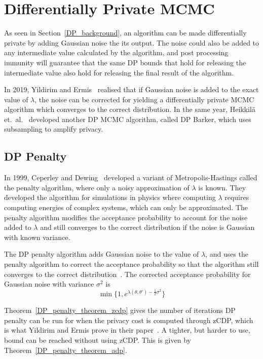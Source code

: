 \documentclass[english,twoside,openright]{HYgraduMLDS}
\begin{document}
\chapter{Differentially Private MCMC}

As seen in Section~\ref{DP_background}, an algorithm can be made differentially 
private by adding Gaussian noise the its output. The noise could also be added 
to any intermediate value calculated by the algorithm, and post processing immunity 
will guarantee that the same DP bounds that hold for releasing the intermediate 
value also hold for releasing the final result of the algorithm.

In 2019, Yildirim and Ermis~\cite{YildirimE19} realised that if Gaussian noise is added to 
the exact value of \(\lambda\), the noise can be corrected for 
yielding a differentially private MCMC algorithm which converges to 
the correct distribution. In the same year, Heikkilä et.\ al.~\cite{HeikkilaJDH19}
developed another DP MCMC algorithm, called DP Barker, which uses subsampling 
to amplify privacy.

\section{DP Penalty}

In 1999, Ceperley and Dewing~\cite{CeD99} developed a variant of 
Metropolis-Hastings called the penalty 
algorithm, where only a noisy approximation of \(\lambda\) is known. They 
developed the algorithm for simulations in physics where computing \(\lambda\)
requires computing energies of complex systems, which can only be approximated.
The penalty algorithm modifies the acceptance probability to account for the 
noise added to \(\lambda\) and still converges to the correct distribution if 
the noise is Gaussian with known variance.

The DP penalty algorithm adds Gaussian noise to the value of \(\lambda\), and 
uses the penalty algorithm to correct the acceptance probability so that 
the algorithm still converges to the correct distribution~\cite{YildirimE19}.
The corrected acceptance probability for Gaussian noise with variance 
\(\sigma^2\) is 
\[
    \min\{1, e^{\lambda(\theta, \theta') - \frac{1}{2}\sigma^2}\}
\]

Theorem~\ref{DP_penalty_theorem_zcdp} gives the number of iterations DP penalty 
can be run for when the privacy cost is computed through zCDP, which is 
what Yildirim and Ermis prove in their paper~\cite{YildirimE19}. A tighter, but 
harder to use, bound can be reached without using zCDP. This is given by 
Theorem~\ref{DP_penalty_theorem_adp}.
\end{document}
